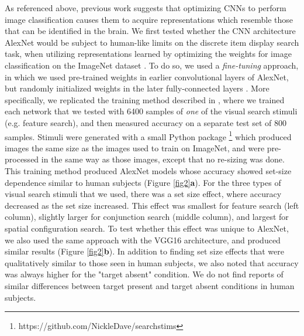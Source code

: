 \documentclass[10pt,letterpaper]{article}
\begin{document}
As referenced above, previous work suggests that optimizing CNNs to perform image 
classification causes them to acquire representations which resemble those that can 
be identified in the brain. We first tested whether the CNN architecture AlexNet 
\cite{krizhevskyImagenetClassificationDeep2012}
would be subject to human-like limits on the discrete item display search task, 
when utilizing representations learned by optimizing the weights for image classification 
on the ImageNet dataset \cite{dengImagenetLargescaleHierarchical2009}. 
To do so, we used a \emph{fine-tuning} approach, in which we used pre-trained weights in earlier 
convolutional layers of AlexNet, but randomly initialized weights in the later 
fully-connected layers \cite{yosinskiHowTransferableAre2014}.
More specifically, we replicated the training method described in
\cite{poderCapacityLimitationsVisual2017}, where we trained each network that we tested with 
6400 samples of \emph{one} of the visual search stimuli (e.g. feature search), and then 
measured accuracy on a separate test set of 800 samples. Stimuli were generated with a 
small Python package \footnote{https://github.com/NickleDave/searchstims} 
which produced images the same size as the images used to train on 
ImageNet, and were pre-processed in the same way as those images, 
except that no re-sizing was done.
This training method produced AlexNet models whose accuracy showed set-size dependence 
similar to human subjects (Figure \ref{fig2}\textbf{a}). 
For the three types of visual search stimuli that we used, there was a set size effect,
where accuracy decreased as the set size increased. 
This effect was smallest for feature search (left column), slightly 
larger for conjunction search (middle column), and largest for spatial configuration 
search. To test whether this effect was unique to AlexNet, we also used the same approach 
with the VGG16 architecture, and produced similar results (Figure \ref{fig2}\textbf{b}). 
In addition to finding set size effects that were qualitatively 
similar to those seen in human subjects, we also noted that accuracy was always higher 
for the "target absent" condition. We do not find reports of similar differences between 
target present and target absent conditions in human subjects.
\end{document}
